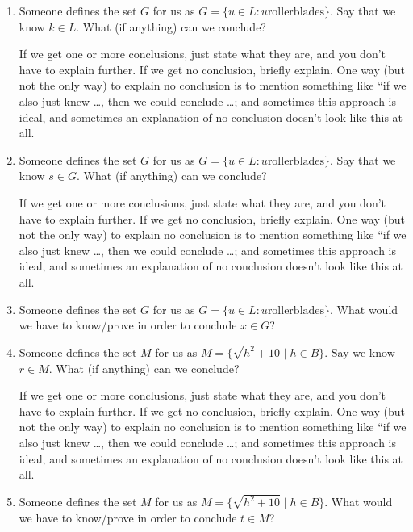 \documentclass{article}
\begin{document}
\begin{enumerate}

    \item Someone defines the set $G$ for us as $G = \{u \in L : u \text{
                  rollerblades}\}$. Say that we know $k \in L$. What (if anything) can we
          conclude?

          If we get one or more conclusions, just state what they are, and you don't have
          to explain further. If we get no conclusion, briefly explain. One way (but not
          the only way) to explain no conclusion is to mention something like ``if we
          also just knew \ldots, then we could conclude \ldots; and sometimes this approach
          is ideal, and sometimes an explanation of no conclusion doesn't look like this
          at all.

      \newpage

    \item Someone defines the set $G$ for us as $G = \{u \in L : u \text{
                  rollerblades}\}$. Say that we know $s \in G$. What (if anything) can we
          conclude?

          If we get one or more conclusions, just state what they are, and you don't have
          to explain further. If we get no conclusion, briefly explain. One way (but not
          the only way) to explain no conclusion is to mention something like ``if we
          also just knew \ldots, then we could conclude \ldots; and sometimes this approach
          is ideal, and sometimes an explanation of no conclusion doesn't look like this
          at all.

          \newpage

    \item Someone defines the set $G$ for us as $G = \{u \in L : u \text{
                  rollerblades}\}$. What would we have to know/prove in order to conclude $x \in
              G$?

              \newpage

    \item Someone defines the set $M$ for us as $M = \{\sqrt{h^2+10} \mid h \in B\}$. Say
          we know $r \in M$. What (if anything) can we conclude?

          If we get one or more conclusions, just state what they are, and you don't have
          to explain further. If we get no conclusion, briefly explain. One way (but not
          the only way) to explain no conclusion is to mention something like ``if we
          also just knew \ldots, then we could conclude \ldots; and sometimes this approach
          is ideal, and sometimes an explanation of no conclusion doesn't look like this
          at all.

              \newpage

    \item Someone defines the set $M$ for us as $M = \{\sqrt{h^2+10} \mid h \in B\}$.
          What would we have to know/prove in order to conclude $t \in M$?

\end{enumerate}
\end{document}
